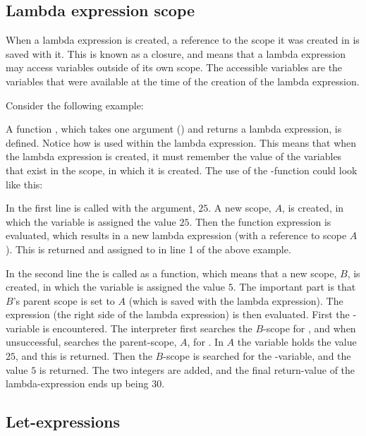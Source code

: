 \subsection{Lambda expression scope}

When a lambda expression is created, a reference to the scope it was created in
is saved with it. This is known as a closure, and means that a lambda
expression may access variables outside of its own scope. The accessible
variables are the variables that were available at the time of the creation of
the lambda expression.

Consider the following example:


A function , which takes one argument () and
returns a lambda expression, is defined. Notice how  is used within
the lambda expression. This means that when the lambda expression is created, it
must remember the value of the variables that exist in the scope, in which it is
created. The use of the -function could look like this:


In the first line  is called with the argument, $25$. A new scope, $A$,
is created, in which the variable  is assigned the value $25$. Then the function
expression is evaluated, which results in a new lambda expression (with a reference to scope $A$).
This is returned and assigned to  in line 1 of the above example.

In the second line the  is called as a function, which means that a new scope, $B$,
is created, in which the variable  is assigned the value $5$. The important part is
that $B$'s parent scope is set to $A$ (which is saved with the lambda expression). The expression
(the right side of the lambda expression) is then evaluated. First the -variable is
encountered. The interpreter first searches the $B$-scope for , and when unsuccessful,
searches the parent-scope, $A$, for . In $A$ the variable  holds the value
$25$, and this is returned. Then the $B$-scope is searched for the -variable, and the value
$5$ is returned. The two integers are added, and the final return-value of the lambda-expression
ends up being $30$.

\subsection{Let-expressions}

